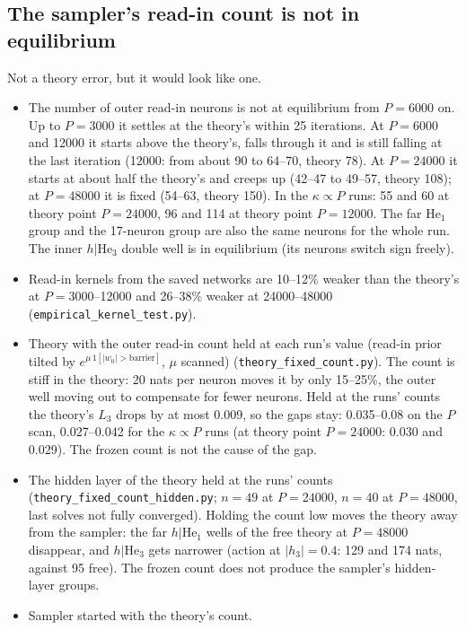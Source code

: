 \documentclass[11pt,a4paper]{article}
\newcommand{\mworked}{\textcolor{worked}{\Large$\bm\checkmark$}}
\newcommand{\mfailed}{\textcolor{failed}{\Large$\bm\times$}}
\newcommand{\munclear}{\textcolor{unclear}{\Large\textbf{?}}}
\newcommand{\mtodo}{\textcolor{neutral}{\Large$\square$}}
\newcommand{\worked}{\item[\mworked]}
\newcommand{\failed}{\item[\mfailed]}
\newcommand{\unclear}{\item[\munclear]}
\newcommand{\todo}{\item[\mtodo]}
\begin{document}
\subsection*{The sampler's read-in count is not in equilibrium}
Not a theory error, but it would look like one.
\begin{itemize}
\worked The number of outer read-in neurons is not at equilibrium from $P=6000$ on. Up to $P=3000$ it settles at the
  theory's within 25 iterations. At $P=6000$ and 12000 it starts above the theory's, falls through it and is still
  falling at the last iteration (12000: from about 90 to 64--70, theory 78). At $P=24000$ it starts at about half the
  theory's and creeps up (42--47 to 49--57, theory 108); at $P=48000$ it is fixed (54--63, theory 150). In the
  $\kappa\propto P$ runs: 55 and 60 at theory point $P=24000$, 96 and 114 at theory point $P=12000$. The far $\mathrm{He}_1$
  group and the 17-neuron group are also the same neurons for the whole run. The inner $h|\mathrm{He}_3$ double well
  is in equilibrium (its neurons switch sign freely).
\unclear Read-in kernels from the saved networks are 10--12\% weaker than the theory's at $P=3000$--12000 and 26--38\%
  weaker at 24000--48000 (\texttt{empirical\_kernel\_test.py}).
\failed Theory with the outer read-in count held at each run's value (read-in prior tilted by
  $e^{\mu\,1[|w_0|>\text{barrier}]}$, $\mu$ scanned) (\texttt{theory\_fixed\_count.py}). The count is stiff in the theory:
  20 nats per neuron moves it by only 15--25\%, the outer well moving out to compensate for fewer neurons. Held at
  the runs' counts the theory's $L_3$ drops by at most 0.009, so the gaps stay: 0.035--0.08 on the $P$ scan,
  0.027--0.042 for the $\kappa\propto P$ runs (at theory point $P=24000$: 0.030 and 0.029). The frozen count is not
  the cause of the gap.
\failed The hidden layer of the theory held at the runs' counts (\texttt{theory\_fixed\_count\_hidden.py}; $n=49$ at
  $P=24000$, $n=40$ at $P=48000$, last solves not fully converged). Holding the count low moves the theory away from
  the sampler: the far $h|\mathrm{He}_1$ wells of the free theory at $P=48000$ disappear, and $h|\mathrm{He}_3$ gets
  narrower (action at $|h_3|=0.4$: 129 and 174 nats, against 95 free). The frozen count does not produce the
  sampler's hidden-layer groups.
\todo Sampler started with the theory's count.
\end{itemize}
\end{document}
